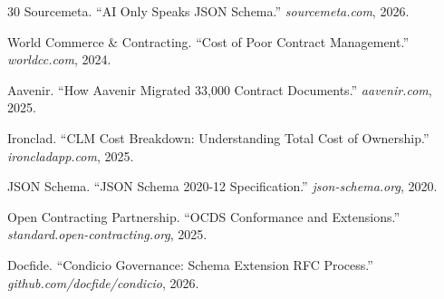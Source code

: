 \documentclass[11pt,a4paper]{article}
\begin{document}
\begin{thebibliography}{30}
Sourcemeta. ``AI Only Speaks JSON Schema.'' \textit{sourcemeta.com}, 2026.

World Commerce \& Contracting. ``Cost of Poor Contract Management.'' \textit{worldcc.com}, 2024.

Aavenir. ``How Aavenir Migrated 33,000 Contract Documents.'' \textit{aavenir.com}, 2025.

Ironclad. ``CLM Cost Breakdown: Understanding Total Cost of Ownership.'' \textit{ironcladapp.com}, 2025.

JSON Schema. ``JSON Schema 2020-12 Specification.'' \textit{json-schema.org}, 2020.

Open Contracting Partnership. ``OCDS Conformance and Extensions.'' \textit{standard.open-contracting.org}, 2025.

Docfide. ``Condicio Governance: Schema Extension RFC Process.'' \textit{github.com/docfide/condicio}, 2026.

\end{thebibliography}
\end{document}
